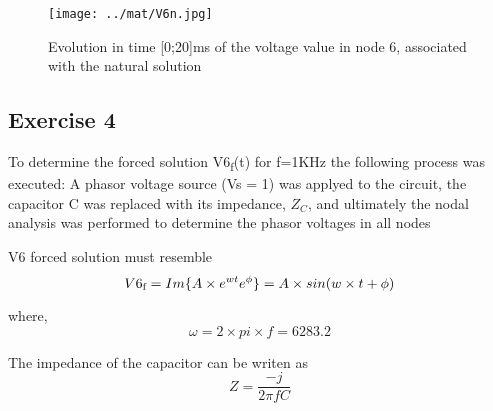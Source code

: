 \vspace{-4mm}
\begin{figure}[h] 
    \centering
    \texttt{[image: ../mat/V6n.jpg]}
    \caption{Evolution in time [0;20]ms of the voltage value in node 6, associated with the natural solution}
    \label{fig:v6n}
\end{figure}
    


\newpage
\subsection{Exercise 4}
To determine the forced solution V6\textsubscript{f}(t) for f=1KHz the following process was executed:
A phasor voltage source (Vs = 1) was applyed to the circuit, the capacitor C was replaced with its impedance, $Z_C$, 
and ultimately  the nodal analysis was performed to determine the phasor voltages in all nodes

V6 forced solution must resemble
\begin{equation}
V6\textsubscript{f} = Im\{A\times e^{wt} e^{\phi}\} = A\times sin(w\times t + \phi)
\end{equation}

where, 
\begin{equation}
\omega = 2\times pi\times f = 6283.2
\end{equation}

The impedance of the capacitor can be writen as
\begin{equation}
    Z = \frac{-j}{2\pi fC}
\end{equation}

